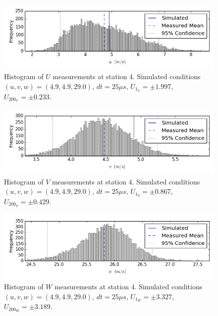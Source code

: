 \begin{figure}[H]
\centering
\includegraphics[width=6in]{figs/Ely_May28th04001/uncertainty_Ely_May28th04001_U}
\caption{Histogram of $U$ measurements at station 4. Simulated conditions 
$(u,v,w)=(4.9, 4.9, 29.0)$, $dt=25 \mu s$, $U_{1_{U}}=\pm 1.997$, 
$U_{200_{U}}=\pm 0.233$.}
\label{fig:uncertainty_Ely_May28th04001_U}
\end{figure}


\begin{figure}[H]
\centering
\includegraphics[width=6in]{figs/Ely_May28th04001/uncertainty_Ely_May28th04001_V}
\caption{Histogram of $V$ measurements at station 4. Simulated conditions 
$(u,v,w)=(4.9, 4.9, 29.0)$, $dt=25 \mu s$, $U_{1_{V}}=\pm 0.867$, 
$U_{200_{V}}=\pm 0.429$.}
\label{fig:uncertainty_Ely_May28th04001_V}
\end{figure}


\begin{figure}[H]
\centering
\includegraphics[width=6in]{figs/Ely_May28th04001/uncertainty_Ely_May28th04001_W}
\caption{Histogram of $W$ measurements at station 4. Simulated conditions 
$(u,v,w)=(4.9, 4.9, 29.0)$, $dt=25 \mu s$, $U_{1_{W}}=\pm 3.327$, 
$U_{200_{W}}=\pm 3.189$.}
\label{fig:uncertainty_Ely_May28th04001_W}
\end{figure}


